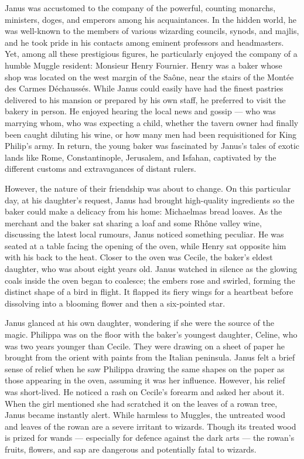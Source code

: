 Janus was accustomed to the company of the powerful, counting monarchs, ministers, doges, and emperors among his acquaintances. In the hidden world, he was well-known to the members of various wizarding councils, synods, and majlis, and he took pride in his contacts among eminent professors and headmasters. Yet, among all these prestigious figures, he particularly enjoyed the company of a humble Muggle resident: Monsieur Henry Fournier. Henry was a baker whose shop was located on the west margin of the Saône, near the stairs of the Montée des Carmes Déchaussés. While Janus could easily have had the finest pastries delivered to his mansion or prepared by his own staff, he preferred to visit the bakery in person. He enjoyed hearing the local news and gossip --- who was marrying whom, who was expecting a child, whether the tavern owner had finally been caught diluting his wine, or how many men had been requisitioned for King Philip's army. In return, the young baker was fascinated by Janus's tales of exotic lands like Rome, Constantinople, Jerusalem, and Isfahan, captivated by the different customs and extravagances of distant rulers.

However, the nature of their friendship was about to change. On this particular day, at his daughter's request, Janus had brought high-quality ingredients so the baker could make a delicacy from his home: Michaelmas bread loaves. As the merchant and the baker sat sharing a loaf and some Rhône valley wine, discussing the latest local rumours, Janus noticed something peculiar. He was seated at a table facing the opening of the oven, while Henry sat opposite him with his back to the heat. Closer to the oven was Cecile, the baker's eldest daughter, who was about eight years old. Janus watched in silence as the glowing coals inside the oven began to coalesce; the embers rose and swirled, forming the distinct shape of a bird in flight. It flapped its fiery wings for a heartbeat before dissolving into a blooming flower and then a six-pointed star.

Janus glanced at his own daughter, wondering if she were the source of the magic. Philippa was on the floor with the baker's youngest daughter, Celine, who was two years younger than Cecile. They were drawing on a sheet of paper he brought from the orient with paints from the Italian peninsula. Janus felt a brief sense of relief when he saw Philippa drawing the same shapes on the paper as those appearing in the oven, assuming it was her influence. However, his relief was short-lived. He noticed a rash on Cecile's forearm and asked her about it. When the girl mentioned she had scratched it on the leaves of a rowan tree, Janus became instantly alert. While harmless to Muggles, the untreated wood and leaves of the rowan are a severe irritant to wizards. Though its treated wood is prized for wands --- especially for defence against the dark arts --- the rowan's fruits, flowers, and sap are dangerous and potentially fatal to wizards.

